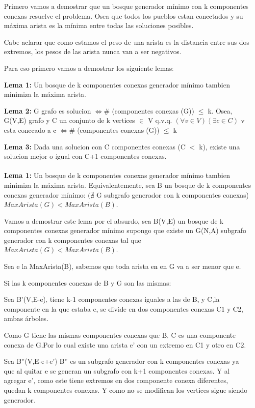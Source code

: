 Primero vamos a demostrar que un bosque generador mínimo con k componentes conexas resuelve el problema. Osea que todos los pueblos estan conectados y su máxima arista es la mínima entre todas las soluciones posibles.

Cabe aclarar que como estamos el peso de una arista es la distancia entre sus dos extremos, los pesos de las arista nunca van a ser negativos.

Para eso primero vamos a demostrar los siguiente lemas:

\textbf{Lema 1:} Un bosque de k componentes conexas generador mínimo tambien minimiza la máxima arista.

\textbf{Lema 2:} G grafo es solucion $\Leftrightarrow \#$ (componentes conexas (G)) $\leq$ k. Osea,  G(V,E) grafo y C un conjunto de k vertices $\in $ V q.v.q. $(\forall v \in V)(\exists c \in C)$ v esta conecado a c $\Leftrightarrow \#$ (componentes conexas (G)) $\leq$ k

\textbf{Lema 3:} Dada una solucion con C componentes conexas (C $<$ k), existe una solucion mejor o igual con C+1 componentes conexas. \\ \\ 


\textbf{Lema 1:} Un bosque de k componentes conexas generador mínimo tambien minimiza la máxima arista. Equivalentemente, sea B un bosque de k componentes conexas generador mínimo: $(\nexists$ G subgrafo generador con k componentes conexas) $MaxArista(G) < MaxArista(B)$.

Vamos a demostrar este lema por el absurdo, sea B(V,E) un bosque de k componentes conexas generador mínimo supongo que existe un G(N,A) subgrafo generador con k componentes conexas tal que $MaxArista(G) < MaxArista(B)$.

Sea e la MaxArista(B), sabemos que toda arista en en G va a ser menor que e.

Si las k componentes conexas de B y G son las mismas:

Sea B'(V,E-e), tiene k-1 componentes conexas iguales a las de B, y C,la componente en la que estaba e, se divide en dos componentes conexas C1 y C2, ambas árboles.

Como G tiene las mismas componentes conexas que B, C es una componente conexa de G.Por lo cual existe una arista e' con un extremo en C1 y otro en C2.

Sea B''(V,E-e+e') B'' es un subgrafo generador con k componentes conexas ya que al quitar e se generan un subgrafo con k+1 componentes conexas. Y al agregar e', como este  tiene extremos en dos componente conexa diferentes, quedan k componentes conexas. Y como no se modifican los vertices sigue siendo generador.

